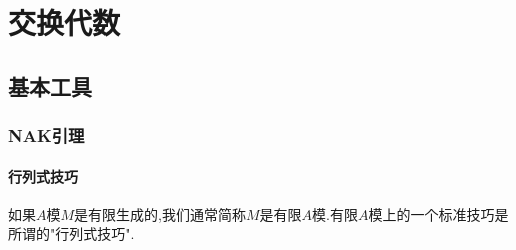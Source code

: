\chapter{交换代数}
\section{基本工具}
\subsection{NAK引理}
\subsubsection{行列式技巧}

如果$A$模$M$是有限生成的,我们通常简称$M$是有限$A$模.有限$A$模上的一个标准技巧是所谓的"行列式技巧".
